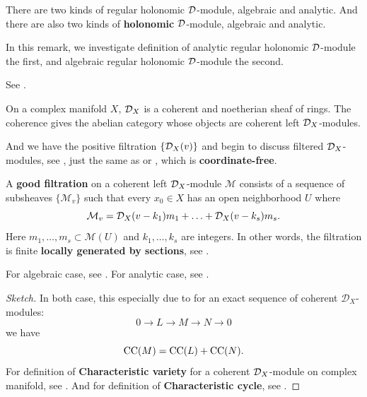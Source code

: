 \begin{remark}\label{rmk_definition_of_regular_holonomicity_jusitfied}
    \mbox{}

    There are two kinds of regular holonomic $\mathcal{D}$-module, algebraic and analytic. And there are also two kinds of \textbf{holonomic} $\mathcal{D}$-module, algebraic and analytic.

    In this remark, we investigate definition of analytic regular holonomic $\mathcal{D}$-module the first, and algebraic regular holonomic $\mathcal{D}$-module the second.


    \begin{definition}\label{def:good_filtration_on_complex_manifold}
        See \cite[Definition~1.4.1.]{Bjork1993AnalyticDModules}.

        On a complex manifold $X$, $\mathcal{D}_X$ is a coherent and noetherian sheaf of rings.
        The coherence gives the abelian category whose objects are coherent left $\mathcal{D}_X$-modules.

        And we have the positive filtration
        $\{\mathcal{D}_X(v)\}$ and begin to discuss filtered $\mathcal{D}_X$-modules, see \cite[Definition~1.2.1]{Bjork1993AnalyticDModules},
        just the same as \cite[Definition~3.1]{chen2024dmodules} or \cite[\href{https://stacks.math.columbia.edu/tag/09CI}{Tag 09CI}]{stacks-project},
        which is \textbf{coordinate-free}.

        A \textbf{good filtration} on a coherent left $\mathcal{D}_X$-module $\mathcal{M}$ consists of
        a sequence of subsheaves $\{\mathcal{M}_v\}$ such that every $x_0 \in X$ has an open neighborhood
        $U$ where
        \[
            \mathcal{M}_v = \mathcal{D}_X(v - k_1) m_1 + \ldots + \mathcal{D}_X(v - k_s) m_s.
        \]
        Here $m_1, \ldots, m_s \subset \mathcal{M}(U)$ and $k_1, \ldots, k_s$ are integers.
        In other words, the filtration is finite \textbf{locally generated by sections}, see \cite[\href{https://stacks.math.columbia.edu/tag/01AL}{Tag 01AL}, \href{https://stacks.math.columbia.edu/tag/01AN}{Tag 01AN}, \href{https://stacks.math.columbia.edu/tag/01B2}{Tag 01B2}]{stacks-project}.
    \end{definition}

    \begin{proposition}
        For algebraic case, see \cite[Prop.~3.1.2.(ii)]{hotta2008d}.
        For analytic case, see \cite[Prop.~3.1.5.]{Bjork1993AnalyticDModules}.
    \end{proposition}
    \begin{proof}[Sketch]
        In both case, this especially due to for an exact sequence of coherent $\mathcal{D}_X$-modules:
        \[
            0 \rightarrow L \rightarrow M \rightarrow N \rightarrow 0
        \]
        we have
        \[
            \operatorname{CC}(M) = \operatorname{CC}(L) + \operatorname{CC}(N).
        \]
        For definition of \textbf{Characteristic variety} for a coherent $\mathcal{D}_X$-module on complex manifold, see \cite[Definition~1.6. or 1.6.16]{Bjork1993AnalyticDModules}.
        And for definition of \textbf{Characteristic cycle}, see \cite[8.2.8 Characteristic cycles.]{Bjork1993AnalyticDModules}.
    \end{proof}


\end{remark}
